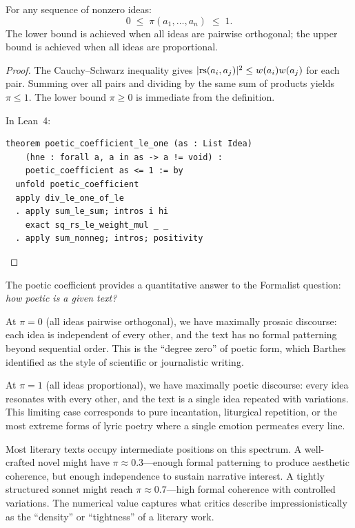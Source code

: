 \begin{theorem}
\label{thm:poetic-bounds}
For any sequence of nonzero ideas:
\[
  0 \;\leq\; \pi(a_1, \ldots, a_n) \;\leq\; 1.
\]
The lower bound is achieved when all ideas are pairwise orthogonal; the upper
bound is achieved when all ideas are proportional.
\end{theorem}

\begin{proof}
The Cauchy--Schwarz inequality gives $|\mathrm{rs}(a_i, a_j)|^2 \leq w(a_i) w(a_j)$
for each pair.  Summing over all pairs and dividing by the same sum of products
yields $\pi \leq 1$.  The lower bound $\pi \geq 0$ is immediate from the
definition.

In Lean~4:
\begin{lstlisting}
theorem poetic_coefficient_le_one (as : List Idea)
    (hne : forall a, a in as -> a != void) :
    poetic_coefficient as <= 1 := by
  unfold poetic_coefficient
  apply div_le_one_of_le
  . apply sum_le_sum; intros i hi
    exact sq_rs_le_weight_mul _ _
  . apply sum_nonneg; intros; positivity
\end{lstlisting}
\end{proof}

\begin{interpretation}
\label{interp:spectrum}
The poetic coefficient provides a quantitative answer to the Formalist question:
\emph{how poetic is a given text?}

At $\pi = 0$ (all ideas pairwise orthogonal), we have maximally prosaic
discourse: each idea is independent of every other, and the text has no formal
patterning beyond sequential order.  This is the ``degree zero'' of poetic form,
which Barthes identified as the style of scientific or journalistic writing.

At $\pi = 1$ (all ideas proportional), we have maximally poetic discourse: every
idea resonates with every other, and the text is a single idea repeated with
variations.  This limiting case corresponds to pure incantation, liturgical
repetition, or the most extreme forms of lyric poetry where a single emotion
permeates every line.

Most literary texts occupy intermediate positions on this spectrum.  A well-crafted
novel might have $\pi \approx 0.3$---enough formal patterning to produce aesthetic
coherence, but enough independence to sustain narrative interest.  A tightly
structured sonnet might reach $\pi \approx 0.7$---high formal coherence with
controlled variations.  The numerical value captures what critics describe
impressionistically as the ``density'' or ``tightness'' of a literary work.
\end{interpretation}



